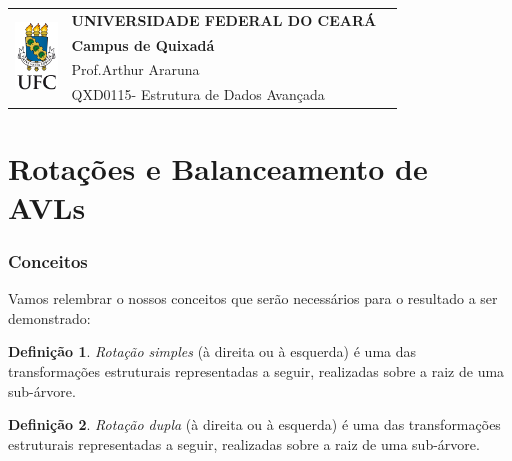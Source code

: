 \documentclass[11pt,twoside]{article}
\theoremstyle{definition}
\newtheorem{definition}{Definição}[section]
\def\disciplinacodigotext{QXD0115}
\def\disciplinanometext{Estrutura de Dados Avançada}
\def\provatitle{Rotações e Balanceamento de AVLs}
\def\professorabbrv{Prof.}
\def\professornometext{Arthur Araruna}
\begin{document}
\noindent
\begin{minipage}{\textwidth}
	\begin{tabularx}{\textwidth}{cXc}
		\multirow{4}{*}{\includegraphics[height=1.8cm]{../brasaoufc.pdf}} & {\bf UNIVERSIDADE FEDERAL DO CEARÁ}         & \multirow{3}{*}{} \\
		                                                                  & {\bf Campus de Quixadá}                     &                   \\
		                                                                  & \professorabbrv\enspace\professornometext   &                   \\
		                                                                  & \disciplinacodigotext - \disciplinanometext & {}                \\
	\end{tabularx}
\end{minipage}

\part*{\provatitle}

\section{Conceitos}

Vamos relembrar o nossos conceitos que serão necessários para o resultado a ser demonstrado:

\begin{definition}
	\emph{Rotação simples} (à direita ou à esquerda) é uma das transformações estruturais representadas a seguir, realizadas sobre a raiz de uma sub-árvore.

	\begin{figure}[h]
		\centering
		\caption{\label{fig:rot-simples}}
		
	\end{figure}
\end{definition}

\begin{definition}
	\emph{Rotação dupla} (à direita ou à esquerda) é uma das transformações estruturais representadas a seguir, realizadas sobre a raiz de uma sub-árvore.

	\begin{figure}[h]
		\centering
		\caption{\label{fig:rot-dupla}}
		
	\end{figure}
\end{definition}
\end{document}
